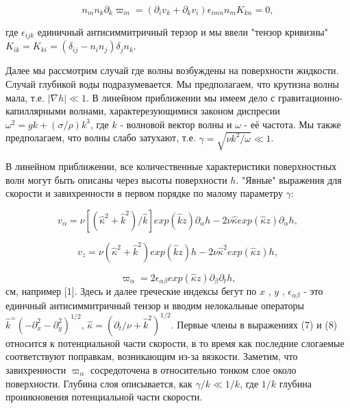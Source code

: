 \begin{equation}
n_m n_k \partial_k \varpi_m = (\partial_i v_k + \partial_k v_i) \epsilon_{imn} n_m K_{kn} = 0,
\end{equation}

где $\epsilon_{ijk}$ единичный антисиммитричный терзор и мы ввели "тензор кривизны" $K_{ik} = K_{ki} = (\delta_{ij} - n_i n_j) \delta_j n_k$.

Далее мы рассмотрим случай где волны возбуждены на поверхности жидкости. Случай глубикой воды подразумевается. Мы предполагаем, что крутизна волны мала, т.е. $|\nabla h| \ll 1$. В линейном приближении мы имеем дело с гравитационно-капиллярными волнами, характерезующимися законом диспресии $\omega^2 = g k + (\sigma/\rho)k^3$, где $k$ - волновой вектор волны и $\omega$ - её частота. Мы также предполагаем, что волны слабо затухают, т.е. $\gamma = \sqrt{\nu k^2/\omega} \ll 1$.

В линейном приближении, все количественные характеристики поверхностных волн могут быть описаны через высоты поверхности $h$. "Явные" выражения для скорости и завихренности в первом порядке по малому параметру $\gamma$:

\begin{equation}
 v_\alpha = \nu[(\hat{\kappa}^2 + \hat{k}^2)/\hat{k}]exp(\hat{k}z)\partial_\alpha h - 2\nu \hat{\kappa} exp(\hat{\kappa}z) \partial_\alpha h,
\end{equation}

\begin{equation}
 v_z = \nu(\hat{\kappa}^2 + \hat{k}^2)exp(\hat{k}z)h - 2\nu \hat{\kappa}^2 exp(\hat{\kappa}z) h,
\end{equation}

\begin{equation}
\varpi_\alpha = 2 \epsilon_{\alpha \beta} exp(\hat{\kappa}z) \partial_\beta \partial_t h,
\end{equation}
см, например [1]. Здесь и далее греческие индексы бегут по $x$ , $y$ , $\epsilon_{\alpha\beta}$ - это единчный антисиммитричный тензор и вводим нелокальные операторы $\hat{k}^ = (-\partial_x^2 - \partial_y^2)^{1/2}$, $\hat{\kappa} = (\partial_t/\nu + \hat{k}^2)^{1/2}$. Первые члены в выражениях (7) и (8) относится к потенциальной части скорости, в то время как последние слогаемые соответствуют поправкам, возникающим из-за вязкости. Заметим, что завихренности $\varpi_\alpha$ сосредоточена в относительно тонком слое около поверхности. Глубина слоя описывается, как $\gamma/k \ll 1/k$, где $1/k$ глубина проникновения потенциальной части скорости.

